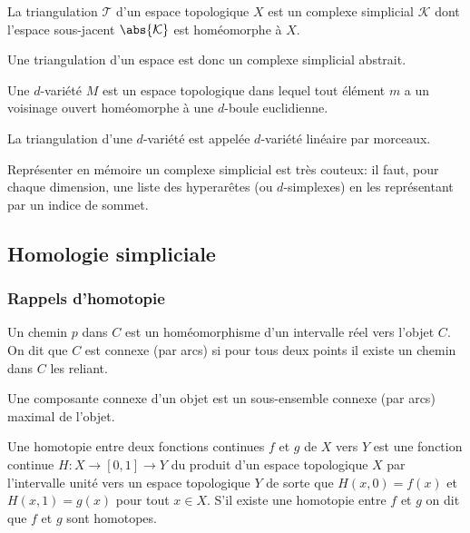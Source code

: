 \documentclass[info, math]{mpb-cours}
\def\mK{\mathcal{K}}
\begin{document}
\begin{definition}
	La triangulation $\mathcal{T}$ d'un espace topologique $X$ est un complexe simplicial $\mK$ dont l'espace sous-jacent $\abs{\mK}$ est homéomorphe à $X$.
\end{definition}
Une triangulation d'un espace est donc un complexe simplicial abstrait.


\begin{definition}
	Une $d$-variété $M$ est un espace topologique dans lequel tout élément $m$ a un voisinage ouvert homéomorphe à une $d$-boule euclidienne.
\end{definition}

\begin{definition}
	La triangulation d'une $d$-variété est appelée $d$-variété linéaire par morceaux.
\end{definition}

Représenter en mémoire un complexe simplicial est très couteux: il faut, pour chaque dimension, une liste des hyperarêtes (ou $d$-simplexes) en les représentant par un indice de sommet.

\subsection{Homologie simpliciale}
\subsubsection{Rappels d'homotopie}
\begin{definition}
	Un chemin $p$ dans $C$ est un homéomorphisme d'un intervalle réel vers l'objet $C$.
	On dit que $C$ est connexe (par arcs) si pour tous deux points il existe un chemin dans $C$ les reliant.
\end{definition}

\begin{definition}
	Une composante connexe d'un objet est un sous-ensemble connexe (par arcs) maximal de l'objet.
\end{definition}

\begin{definition}
	Une homotopie entre deux fonctions continues $f$ et $g$ de $X$ vers $Y$ est une fonction continue $H: X \to  [0, 1] \to Y$ du produit d'un espace topologique $X$ par l'intervalle unité vers un espace topologique $Y$ de sorte que $H(x, 0) = f(x)$ et $H(x, 1) = g(x)$ pour tout $x \in X$.
	S'il existe une homotopie entre $f$ et $g$ on dit que $f$ et $g$ sont homotopes.
\end{definition}
\end{document}
